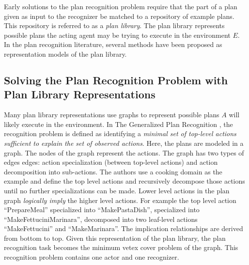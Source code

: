 Early solutions to the plan recognition problem require that the part of a plan given as input to the recognizer be matched to a repository of example plans. This repository is referred to as a \textit{plan library}. The plan library represents possible plans the acting agent may be trying to execute in the environment $E$. In the plan recognition literature, several methods have been proposed as representation models of the plan library.

\subsection{Solving the Plan Recognition Problem with Plan Library Representations}
Many plan library representations use graphs to represent possible plans $A$ will likely execute in the environment. In The Generalized Plan Recognition \cite{kautz1986generalized}, the recognition problem is defined as identifying a \textit{minimal set of top-level actions sufficient to explain the set of observed actions}. 
Here, the plans are modeled in a graph. 
The nodes of the graph represent the actions. 
The graph has two types of edges edges: action specialization (between top-level actions) and action decomposition into sub-actions.
The authors use a cooking domain as the example and define the top level actions and recursively decompose those actions until no further specializations can be made. 
Lower level actions in the plan graph \textit{logically imply} the higher level actions. 
For example the top level action ``PrepareMeal'' specialized into ``MakePastaDish'', specialized into ``MakeFettuciniMarinara'', decomposed into two leaf-level actions ``MakeFettucini'' and ``MakeMarinara''. The implication relationships are derived from bottom to top. Given this representation of the plan library, the plan recognition task becomes the minimum vetex cover problem of the graph. This recognition problem contains one actor and one recognizer.


